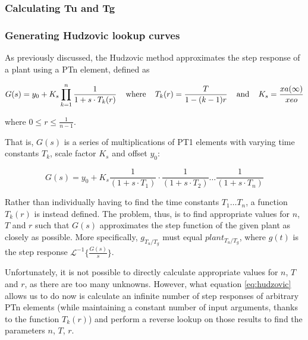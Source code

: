 \subsubsection{Calculating Tu and Tg}



\subsubsection{Generating Hudzovic lookup curves}

As previously discussed, the Hudzovic method approximates the step response of a
plant using a PTn element, defined as

\begin{equation}
    G(s) = y_0 + K_s \prod_{k=1}^{n} \frac{1}{1+s \cdot T_k(r)} \textrm{\hspace{4mm}where\hspace{4mm}} T_k(r) = \frac{T}{1 - (k-1)r} \textrm{\hspace{4mm}and\hspace{4mm}} K_s = \frac{xa(\infty)}{xeo}
    \label{eq:hudzovic}
\end{equation}

where $0 \le r \leq \frac{1}{n-1}$.

That is, $G(s)$ is a series of multiplications of PT1 elements with varying time
constants $T_k$, scale factor $K_s$ and offset $y_0$:

\begin{equation}
    G(s) = y_0 + K_s \frac{1}{\left(1+s\cdot T_1\right)}\cdot\frac{1}{\left(1+s\cdot T_2\right)}\ldots\frac{1}{\left(1+s\cdot T_n\right)}
\end{equation}

Rather  than individually having to find the time constants $T_1\ldots  T_n$,  a
function $T_k(r)$ is instead  defined. The problem, thus, is to find appropriate
values for $n$, $T$ and  $r$  such that $G(s)$ approximates the step function of
the  given  plant as closely as possible. More specifically, $g_{T_u/T_g}$  must
equal    $plant_{T_u/T_g}$,    where     $g(t)$    is    the    step    response
$\mathscr{L}^{-1}\{\frac{G(s)}{s}\}$.

Unfortunately,  it  is not possible to directly calculate appropriate values for
$n$,  $T$  and  $r$,  as there are too many  unknowns.  However,  what  equation
\ref{eq:hudzovic} allows us to do now  is  calculate  an infinite number of step
responses  of  arbitrary  PTn  elements (while maintaining a constant number  of
input  arguments,  thanks to the function $T_k(r)$) and perform a reverse lookup
on those results to find the parameters $n$, $T$, $r$.

